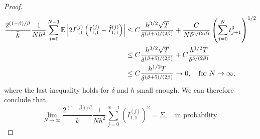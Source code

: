 \documentclass[10pt]{article}
\begin{document}
\begin{proof}
\begin{equation}
\begin{aligned}
	\frac{2^{(1-\beta)/\beta}}{\bar k} \frac1{Nh^2} \sum_{j=0}^{N-1} \operatorname{\mathbb{E}} \left\lvert2I_{1,1}^{(j)}\left(I_{1,1}^{(j)} - \widehat I_{1,1}^{(j)}\right)\right\rvert &\leq C \frac{h^{3/2}\sqrt{T}}{\delta^{(\beta+5)/(2\beta)}} + \frac{C}{N\delta^{5/(2\beta)}} \left(\sum_{j=0}^{N} t_{j+1}^3\right)^{1/2}\\
	&\leq C \frac{h^{3/2}\sqrt{T}}{\delta^{(\beta+5)/(2\beta)}} + C\frac{h^{1/2} T}{\delta^{5/(2\beta)}} \\
	&\leq C \frac{h^{1/2}T}{\delta^{(\beta+5)/(2\beta)}} \to 0, \quad \text{for } N \to \infty, 
\end{aligned}
\end{equation}
where the last inequality holds for $\delta$ and $h$ small enough. We can therefore conclude that
\begin{equation}
	\lim_{N\to \infty} 	\frac{2^{(1-\beta)/\beta}}{\bar k} \frac1{Nh^2} \sum_{j=0}^{N-1} \left(I_{1,1}^{(j)} \right)^2 = \Sigma, \quad \text{in probability.}
\end{equation}



\end{proof}
\end{document}
